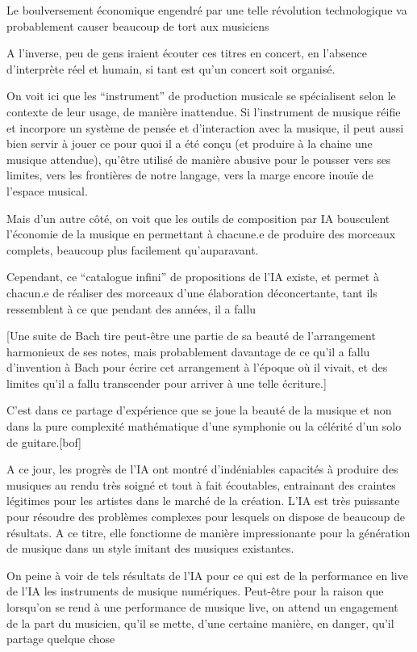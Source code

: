 Le boulversement économique engendré par une telle révolution technologique va probablement causer beaucoup de tort aux musiciens

A l'inverse, peu de gens iraient écouter ces titres en concert, en l'absence d'interprète réel et humain, si tant est qu'un concert soit organisé.

On voit ici que les ``instrument'' de production musicale se spécialisent selon le contexte de leur usage, de manière inattendue.
Si l'instrument de musique réifie et incorpore un système de pensée et d'interaction avec la musique, il peut aussi bien servir à jouer ce pour quoi il a été conçu (et produire à la chaine une musique attendue), qu'être utilisé de manière abusive pour le pousser vers ses limites, vers les frontières de notre langage, vers la marge encore inouïe de l'espace musical.

Mais d'un autre côté, on voit que les outils de composition par IA bousculent l'économie de la musique en permettant à chacune.e de produire des morceaux complets, beaucoup plus facilement qu'auparavant.

Cependant, ce ``catalogue infini'' de propositions de l'IA existe, et permet à chacun.e de réaliser des morceaux d'une élaboration déconcertante, tant ils ressemblent à ce que pendant des années, il a fallu 

[Une suite de Bach tire peut-être une partie de sa beauté de l'arrangement harmonieux de ses notes, mais probablement davantage de ce qu'il a fallu d'invention à Bach pour écrire cet arrangement à l'époque où il vivait, et des limites qu'il a fallu transcender pour arriver à une telle écriture.]

C'est dans ce partage d'expérience que se joue la beauté de la musique et non dans la pure complexité mathématique d'une symphonie ou la célérité d'un solo de guitare.[bof]

A ce jour, les progrès de l'IA ont montré d'indéniables capacités à produire des musiques au rendu très soigné et tout à fait écoutables, entrainant des craintes légitimes pour les artistes dans le marché de la création. 
L'IA est très puissante pour résoudre des problèmes complexes pour lesquels on dispose de beaucoup de résultats. A ce titre, elle fonctionne de manière impressionante pour la génération de musique dans un style imitant des musiques existantes.

On peine à voir de tels résultats de l'IA pour ce qui est de la performance en live de l'IA les instruments de musique numériques.
Peut-être pour la raison que lorsqu'on se rend à une performance de musique live, on attend un engagement de la part du musicien, qu'il se mette, d'une certaine manière, en danger, qu'il partage quelque chose


